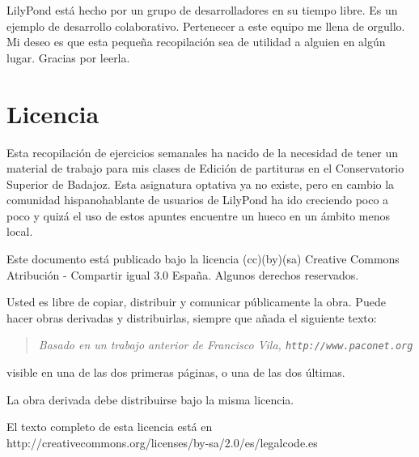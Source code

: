 LilyPond está hecho por un grupo de desarrolladores en su tiempo
libre. Es un ejemplo de desarrollo colaborativo. Pertenecer a este
equipo me llena de orgullo.  Mi deseo es que esta pequeña recopilación
sea de utilidad a alguien en algún lugar.  Gracias por leerla.


\section*{Licencia}

Esta recopilación de ejercicios semanales ha nacido de la necesidad de
tener un material de trabajo para mis clases de Edición de partituras
en el Conservatorio Superior de Badajoz.  Esta asignatura optativa ya
no existe, pero en cambio la comunidad hispanohablante de usuarios de
LilyPond ha ido creciendo poco a poco y quizá el uso de estos apuntes
encuentre un hueco en un ámbito menos local.

Este documento está publicado bajo la licencia (cc)(by)(sa) Creative
Commons Atribución - Compartir igual 3.0 España.  Algunos derechos
reservados.

Usted es libre de copiar, distribuir y comunicar públicamente la obra.
Puede hacer obras derivadas y distribuirlas, siempre que añada el
siguiente texto:

\begin{quote}
\emph{Basado en un trabajo anterior de Francisco Vila,
  \texttt{http://www.paconet.org} }
\end{quote}

visible en una de las dos primeras páginas, o una de las dos últimas.

La obra derivada debe distribuirse bajo la misma licencia.

El texto completo de esta licencia está en
http://creativecommons.org/licenses/by-sa/2.0/es/legalcode.es



